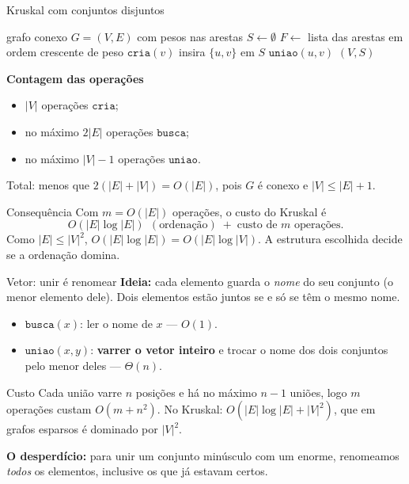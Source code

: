 \documentclass[aspectratio=169,10pt]{beamer}
\newcommand{\Cria}{\mathtt{cria}}
\newcommand{\Busca}{\mathtt{busca}}
\newcommand{\Uniao}{\mathtt{uniao}}
\begin{document}
\begin{frame}[t]{Kruskal com conjuntos disjuntos}
  \footnotesize
  \begin{minipage}[t]{.52\linewidth}
    \begin{algorithmic}[1]
      \Require grafo conexo $G=(V,E)$ com pesos nas arestas
      \State $S\gets\emptyset$
      \State $F\gets$ lista das arestas em ordem crescente de peso
      \State $\Cria(v)$
      \EndFor
      \If{$\Busca(u)\neq\Busca(v)$}
      \State insira $\{u,v\}$ em $S$
      \State $\Uniao(u,v)$
      \EndIf
      \EndFor
      \State \Return $(V,S)$
    \end{algorithmic}
  \end{minipage}
  \hfill
  \begin{minipage}[t]{.44\linewidth}
    \textbf{Contagem das operações}
    \begin{itemize}
    \item $|V|$ operações $\Cria$;
    \item no máximo $2|E|$ operações $\Busca$;
    \item no máximo $|V|-1$ operações $\Uniao$.
    \end{itemize}
    Total: menos que $2(|E|+|V|)=O(|E|)$, pois $G$ é conexo e
    $|V|\leq|E|+1$.
  \end{minipage}

  \smallskip
  \footnotesize
  \begin{block}{Consequência}
    Com $m=O(|E|)$ operações, o custo do Kruskal é
    \[
      O(|E|\log|E|)\ \ (\text{ordenação})\;+\;\text{custo de }m\text{ operações}.
    \]
    Como $|E|\leq|V|^2$, $O(|E|\log|E|)=O(|E|\log|V|)$.  A estrutura
    escolhida decide se a ordenação domina.
  \end{block}
\end{frame}

\begin{frame}[t]{Vetor: unir é renomear}
  \small
  \textbf{Ideia:} cada elemento guarda o \textit{nome} do seu conjunto
  (o menor elemento dele).  Dois elementos estão juntos se e só se têm o
  mesmo nome.
  \begin{itemize}
  \item $\Busca(x)$: ler o nome de $x$ --- $O(1)$.
  \item $\Uniao(x,y)$: \textbf{varrer o vetor inteiro} e trocar o nome
    dos dois conjuntos pelo menor deles --- $\Theta(n)$.
  \end{itemize}

  \medskip
  \begin{alertblock}{Custo}
    Cada união varre $n$ posições e há no máximo $n-1$ uniões, logo
    $m$ operações custam $O(m+n^2)$.  No Kruskal:
    $O(|E|\log|E|+|V|^2)$, que em grafos esparsos é dominado por $|V|^2$.
  \end{alertblock}

  \medskip
  \textbf{O desperdício:} para unir um conjunto minúsculo com um
  enorme, renomeamos \textit{todos} os elementos, inclusive os que já
  estavam certos.
\end{frame}
\end{document}
